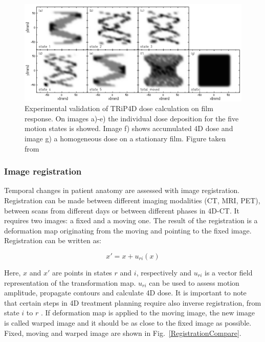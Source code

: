 \documentclass[type=dr, dr=rernat, accentcolor=tud7b,colorbacktitle, bigchapter, openright, twoside, 12pt ]{tudthesis}
\begin{document}
\begin{figure}[H]
\begin{center}
\includegraphics[scale=0.35]{./Images/4DtreatmentPlanning.png}
\caption{Experimental validation of TRiP4D dose calculation on film response. On images a)-e) the individual dose deposition for the five motion states is showed.
Image f) shows accumulated 4D dose and image g) a homogeneous dose on a stationary film. Figure taken from \cite{Richter2012}}
\label{TRiP4Ddose}
\end{center}
\end{figure}

\subsubsection{Image registration}
\label{sec:registration}


Temporal changes in patient anatomy are assessed with image registration. Registration can be made between different imaging modalities (CT, MRI, PET), between scans from different days or between
different phases in 4D-CT. It requires two images: a fixed and a moving one. The result of the registration is a deformation map originating from the moving and pointing to the fixed image. Registration can be written as:


\begin{equation}
\label{df}
x' = x + u_{ri}(x)
\end{equation} 

Here, $x$ and $x'$ are points in states $r$ and $i$, respectively and $u_{ri}$ is a vector field representation of the transformation map. $u_{ri}$ can be used to assess motion amplitude, propagate contours and calculate 4D dose.
It is important to note that certain steps in 4D treatment planning require also inverse registration, from state $i$ to $r$ \cite{Richter2012}. If deformation map is applied to the moving image, 
the new image is called warped image and it should be as close to the fixed image as possible. Fixed, moving and warped image are shown in Fig.~\ref{RegistrationCompare}. 
\end{document}
